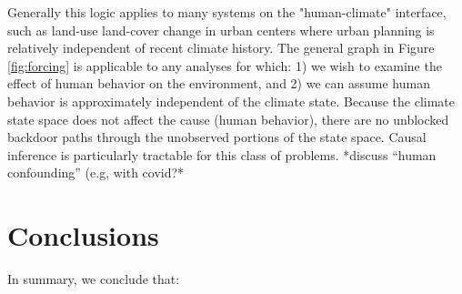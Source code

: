 \documentclass[12pt]{article}
\begin{document}
Generally this logic applies to many systems on the "human-climate"
interface, such as land-use land-cover change in urban centers where
urban planning is relatively independent of recent climate
history. The general graph in Figure \ref{fig:forcing} is applicable
to any analyses for which: 1) we wish to examine the effect of human
behavior on the environment, and 2) we can assume human behavior is
approximately independent of the climate state. Because the climate
state space does not affect the cause (human behavior), there are no
unblocked backdoor paths through the unobserved portions of the state
space. Causal inference is particularly tractable for this class of
problems. *discuss ``human confounding'' (e.g, with covid?*

\section{Conclusions}

In summary, we conclude that:
\end{document}
